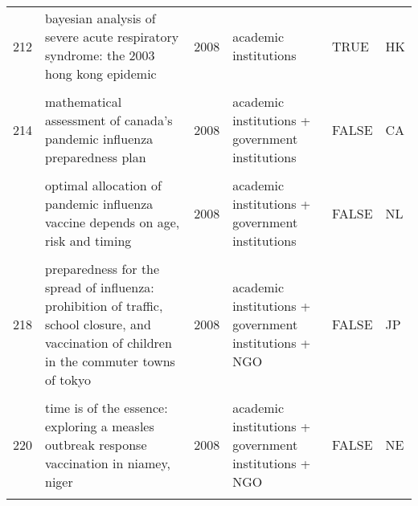 \documentclass[
]{article}
\begin{document}
\begin{landscape}
\begin{longtable}{l>{\raggedright\arraybackslash}p{4cm}l>{\raggedright\arraybackslash}p{3.5cm}l>{\raggedright\arraybackslash}p{1.5cm}}
212 & bayesian analysis of severe acute respiratory syndrome: the 2003 hong kong epidemic & 2008 & academic institutions & TRUE & HK\\
\cellcolor{gray!6}{213} & \cellcolor{gray!6}{hepatitis b vaccination and changes in sexual risk behaviour among men who have sex with men in amsterdam} & \cellcolor{gray!6}{2008} & \cellcolor{gray!6}{academic institutions + government institutions} & \cellcolor{gray!6}{FALSE} & \cellcolor{gray!6}{NL}\\
214 & mathematical assessment of canada's pandemic influenza preparedness plan & 2008 & academic institutions + government institutions & FALSE & CA\\
\cellcolor{gray!6}{215} & \cellcolor{gray!6}{modeling targeted layered containment of an influenza pandemic in the united states} & \cellcolor{gray!6}{2008} & \cellcolor{gray!6}{academic institutions + NGO} & \cellcolor{gray!6}{FALSE} & \cellcolor{gray!6}{US}\\
\addlinespace
216 & optimal allocation of pandemic influenza vaccine depends on age, risk and timing & 2008 & academic institutions + government institutions & FALSE & NL\\
\cellcolor{gray!6}{217} & \cellcolor{gray!6}{pandemic simulation of antivirals plus school closures: buying time until strain-specific vaccine is available} & \cellcolor{gray!6}{2008} & \cellcolor{gray!6}{academic institutions + government institutions} & \cellcolor{gray!6}{FALSE} & \cellcolor{gray!6}{US}\\
218 & preparedness for the spread of influenza: prohibition of traffic, school closure, and vaccination of children in the commuter towns of tokyo & 2008 & academic institutions + government institutions + NGO & FALSE & JP\\
\cellcolor{gray!6}{219} & \cellcolor{gray!6}{scenarios of diffusion and control of an influenza pandemic in italy} & \cellcolor{gray!6}{2008} & \cellcolor{gray!6}{academic institutions + government institutions} & \cellcolor{gray!6}{FALSE} & \cellcolor{gray!6}{IT}\\
220 & time is of the essence: exploring a measles outbreak response vaccination in niamey, niger & 2008 & academic institutions + government institutions + NGO & FALSE & NE\\
\addlinespace
\cellcolor{gray!6}{221} & \cellcolor{gray!6}{a stochastic equation-based model of the value of international air-travel restrictions for controlling pandemic flu} & \cellcolor{gray!6}{2007} & \cellcolor{gray!6}{NGO} & \cellcolor{gray!6}{FALSE} & \cellcolor{gray!6}{global}\\

\end{longtable}
\end{landscape}
\end{document}

